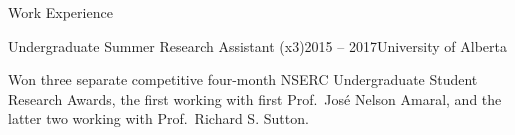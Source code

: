 \documentclass{cv}
\begin{document}
\begin{rSection}{Work Experience}
\clearpage

\vspace*{1em}

\begin{rSubsection}{Undergraduate Summer Research Assistant (x3)}{2015 -- 2017}{University of Alberta}
    \item Won three separate competitive four-month NSERC Undergraduate Student Research Awards, the first working with first Prof.\ Jos{\'{e}} Nelson Amaral, and the latter two working with Prof.\ Richard S. Sutton.
\end{rSubsection}

\end{rSection}

\end{document}
